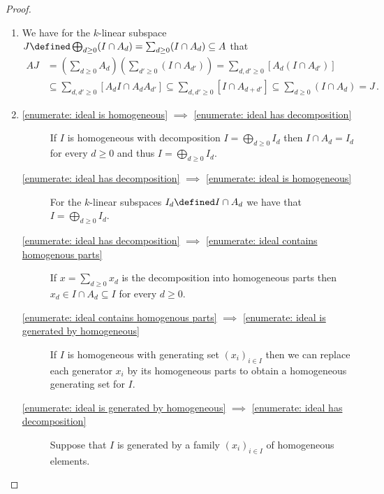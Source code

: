 \begin{proof}
  \leavevmode
  \begin{enumerate}
    \item
      We have for the $k$-linear subspace $J \defined \bigoplus_{d \geq 0} (I \cap A_d) = \sum_{d \geq 0} (I \cap A_d) \subseteq A$ that
      \begin{align*}
                    A J
        &=          \left( \sum_{d \geq 0} A_d \right)\left( \sum_{d' \geq 0} (I \cap A_{d'}) \right)
         =          \sum_{d, d' \geq 0} [ A_d (I \cap A_{d'}) ] \\
        &\subseteq  \sum_{d, d' \geq 0} [ A_d I \cap A_d A_{d'} ]
         \subseteq  \sum_{d, d' \geq 0} [ I \cap A_{d+d'} ]
         \subseteq  \sum_{d \geq 0} (I \cap A_d)
         =          J \,.
      \end{align*}
    \item
      \begin{description}
        \item[\ref*{enumerate: ideal is homogeneous}
              $\implies$
              \ref*{enumerate: ideal has decomposition}]
          If $I$ is homogeneous with decomposition $I = \bigoplus_{d \geq 0} I_d$ then $I \cap A_d = I_d$ for every $d \geq 0$ and thus $I = \bigoplus_{d \geq 0} I_d$.
        \item[\ref*{enumerate: ideal has decomposition}
              $\implies$
              \ref*{enumerate: ideal is homogeneous}]
          For the $k$-linear subspaces $I_d \defined I \cap A_d$ we have that $I = \bigoplus_{d \geq 0} I_d$.
        \item[\ref*{enumerate: ideal has decomposition}
              $\implies$
              \ref*{enumerate: ideal contains homogenous parts}]
          If $x = \sum_{d \geq 0} x_d$ is the decomposition into homogeneous parts then $x_d \in I \cap A_d \subseteq I$ for every $d \geq 0$.
        \item[\ref*{enumerate: ideal contains homogenous parts}
              $\implies$
              \ref*{enumerate: ideal is generated by homogeneous}]
          If $I$ is homogeneous with generating set $(x_i)_{i \in I}$ then we can replace each generator $x_i$ by its homogeneous parts to obtain a homogeneous generating set for $I$.
        \item[\ref*{enumerate: ideal is generated by homogeneous}
              $\implies$
              \ref*{enumerate: ideal has decomposition}]
          Suppose that $I$ is generated by a family $(x_i)_{i \in I}$ of homogeneous elements.

\end{description}
\end{enumerate}
\end{proof}

